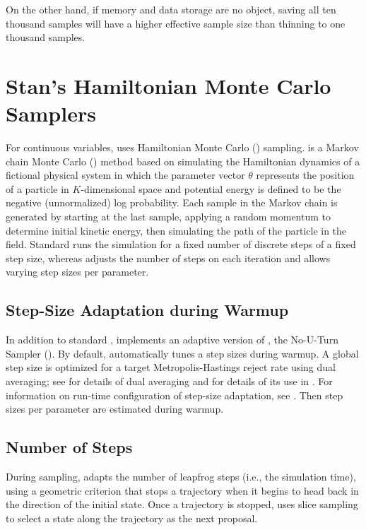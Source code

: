 On the other hand, if memory and data storage are no object, saving all
ten thousand samples will have a higher effective sample size than
thinning to one thousand samples.

\section{Stan's Hamiltonian Monte Carlo Samplers}\label{intro-samplers.section}

For continuous variables, \Stan uses Hamiltonian Monte Carlo (\HMC)
sampling. \HMC is a Markov chain Monte Carlo (\MCMC) method based on
simulating the Hamiltonian dynamics of a fictional physical system in
which the parameter vector $\theta$ represents the position of a
particle in $K$-dimensional space and potential energy is defined to
be the negative (unnormalized) log probability.  Each sample in the
Markov chain is generated by starting at the last sample, applying a
random momentum to determine initial kinetic energy, then simulating
the path of the particle in the field.  Standard \HMC runs the
simulation for a fixed number of discrete steps of a fixed step size,
whereas \NUTS adjusts the number of steps on each iteration and allows
varying step sizes per parameter.



\subsection{Step-Size Adaptation during Warmup}

In addition to standard \HMC, \Stan implements an adaptive version of
\HMC, the No-U-Turn Sampler (\NUTS).  By default, \NUTS automatically
tunes a step sizes during warmup.  A global step size is optimized for
a target Metropolis-Hastings reject rate using dual averaging; see
\citep{Nesterov:2009} for details of dual averaging and
\citep{Hoffman-Gelman:2011,Hoffman-Gelman:2013} 
for details of its use in \Stan.  For
information on run-time configuration of step-size adaptation, see
.  Then step sizes per parameter
are estimated during warmup.  

\subsection{Number of Steps}

During sampling, \NUTS adapts the number of leapfrog steps (i.e., the
simulation time), using a geometric criterion that stops a trajectory
when it begins to head back in the direction of the initial state.
Once a trajectory is stopped, \NUTS uses slice sampling to select a
state along the trajectory as the next proposal.

